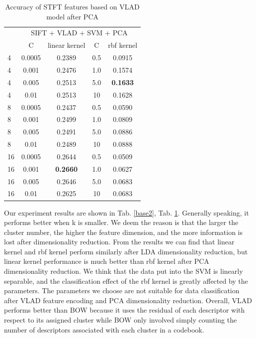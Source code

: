 \documentclass[conference]{IEEEtran}
\begin{document}
\begin{table}[htbp]
	\centering
	\newcommand{\tabincell}[2]{\begin{tabular}{@{}#1@{}}#2\end{tabular}}
	\renewcommand\arraystretch{1.0}
	\caption{Accuracy of STFT features based on VLAD model after PCA}
	\label{base3}%
	\begin{tabular}{@{}p{1cm}<{\centering}|c|c|c|c}
		\hline
		\multirow{2}{*}{\diagbox[height=2\line,width=1.42cm,font=\tiny]{$k$}{Acc.}{$\mathit{M}$}} &
		\multicolumn{4}{c}{SIFT + VLAD + SVM + PCA}\\
		\cline{2-5}
		& {C} & {linear kernel} & {C} & {rbf kernel}\\
		\hline
		4   & 0.0005  & 0.2389 & 0.5 & 0.0915\\
		4   & 0.001  & 0.2476 & 1.0 & 0.1574\\
		4   & 0.005  & 0.2513 & 5.0 & \textbf{0.1633}\\
        4   & 0.01  & 0.2513 & 10 & 0.1628\\
        \hline
		8   & 0.0005 & 0.2437 & 0.5 & 0.0590\\
		8   & 0.001 & 0.2499 & 1.0 & 0.0809\\
		8   & 0.005 & 0.2491 & 5.0 & 0.0886\\
        8   & 0.01  & 0.2489 & 10 & 0.0888\\
        \hline
		16   & 0.0005  & 0.2644 & 0.5 & 0.0509\\
		16   & 0.001  & \textbf{0.2660} & 1.0 & 0.0627\\
		16   & 0.005  & 0.2646 & 5.0 & 0.0683\\
		16   & 0.01  & 0.2625 & 10 & 0.0683\\
		\hline
	\end{tabular}
\end{table}

Our experiment results are shown in Tab. \ref{base2}, Tab. \ref{base3}. Generally speaking, it performs better when k is smaller. We deem the reason is that the larger the cluster number, the higher the feature dimension, and the more information is lost after dimensionality reduction. From the results we can find that linear kernel and rbf kernel perform similarly after LDA dimensionality reduction, but linear kernel performance is much better than rbf kernel after PCA dimensionality reduction. We think that the data put into the SVM is linearly separable, and the classification effect of the rbf kernel is greatly affected by the parameters. The parameters we choose are not suitable for data classification after VLAD feature encoding and PCA dimensionality reduction. Overall, VLAD performs better than BOW because it uses the residual of each descriptor with respect to its assigned cluster while BOW only involved simply counting the number of descriptors associated with each cluster in a codebook.
\end{document}
